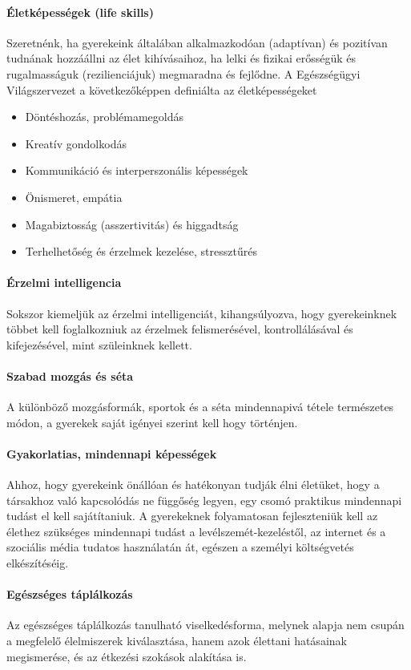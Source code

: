 \paragraph{Életképességek (life skills)}

Szeretnénk, ha gyerekeink általában alkalmazkodóan (adaptívan) és pozitívan
tudnának hozzáállni az élet kihívásaihoz, ha lelki és fizikai erősségük és
rugalmasságuk (rezilienciájuk) megmaradna és fejlődne.	 A Egészségügyi
Világszervezet \citep{oecd99lifeskills} a következőképpen definiálta  az
életképességeket
\begin{itemize}
  \item Döntéshozás, problémamegoldás

  \item Kreatív gondolkodás

  \item Kommunikáció és interperszonális képességek

  \item Önismeret, empátia

  \item Magabiztosság (asszertivitás) és higgadtság

  \item Terhelhetőség és érzelmek kezelése, stressztűrés
\end{itemize}
\paragraph{Érzelmi intelligencia}

Sokszor kiemeljük az érzelmi intelligenciát, kihangsúlyozva, hogy gyerekeinknek
többet kell foglalkozniuk az érzelmek felismerésével, kontrollálásával és
kifejezésével, mint szüleinknek kellett.

\paragraph{Szabad mozgás és séta}

A különböző mozgásformák, sportok és a séta mindennapivá tétele természetes
módon, a gyerekek saját igényei szerint kell hogy történjen.

\paragraph{Gyakorlatias, mindennapi képességek}

Ahhoz, hogy gyerekeink önállóan és hatékonyan tudják élni életüket, hogy a
társakhoz való kapcsolódás ne függőség legyen, egy csomó praktikus mindennapi
tudást el kell sajátítaniuk. A gyerekeknek folyamatosan fejleszteniük kell az
élethez szükséges mindennapi tudást a levélszemét-kezeléstől, az internet és a szociális média
tudatos használatán át, egészen a személyi költségvetés elkészítéséig.

\paragraph{Egészséges táplálkozás}

Az egészséges táplálkozás tanulható viselkedésforma, melynek alapja nem csupán
a megfelelő élelmiszerek kiválasztása, hanem azok élettani hatásainak
megismerése, és az étkezési szokások alakítása is.


